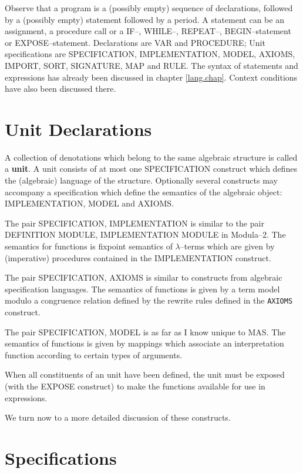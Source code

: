 Observe that a program is a (possibly empty) sequence of 
declarations, followed by a (possibly empty) statement
followed by a period.
A statement can be an assignment, a procedure call or
a IF--, WHILE--, REPEAT--, BEGIN--statement or
EXPOSE--statement.
Declarations are VAR and PROCEDURE; 
Unit specifications are 
SPECIFICATION, IMPLEMENTATION, MODEL, AXIOMS, 
IMPORT, SORT, SIGNATURE, MAP and RULE.
The syntax of statements and expressions
has already been discussed in chapter \ref{lang.chap}.
Context conditions have also been discussed there.


\section{Unit Declarations}

A collection of denotations which belong to the 
same algebraic structure is called a {\bf unit}.
A unit consists of at most one 
SPECIFICATION construct which defines the 
(algebraic) language of the structure.
Optionally several constructs may accompany a specification 
which define the semantics of the algebraic object: 
IMPLEMENTATION, MODEL and AXIOMS.

The pair SPECIFICATION, IMPLEMENTATION is similar to the pair 
DEFINITION MODULE, IMPLEMENTATION MODULE in Modula--2. 
The semantics for functions is fixpoint semantics of 
$\lambda$--terms which are given by (imperative) 
procedures contained in the IMPLEMENTATION construct.

The pair SPECIFICATION, AXIOMS 
is similar to constructs from algebraic specification 
languages. The semantics of functions is given by 
a term model modulo a congruence relation defined by 
the rewrite rules defined in the \verb/AXIOMS/ construct.

The pair SPECIFICATION, MODEL is as far as I know unique to MAS. 
The semantics of functions is given by mappings 
which associate an interpretation function according to
certain types of arguments.  

When all constituents of an unit have been defined, 
the unit must be exposed (with the EXPOSE construct) 
to make the functions available for use in expressions.

We turn now to a more detailed discussion 
of these constructs.


\section{Specifications}

